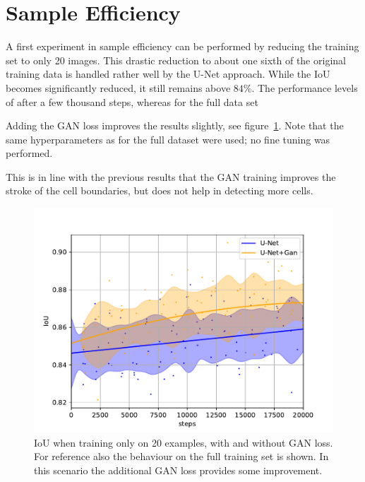 \documentclass[aps,prl,twocolumn,groupedaddress,amsmath,amssymb]{revtex4-1}
\begin{document}
    \section{Sample Efficiency}

    A first experiment in sample efficiency can be performed by reducing the training set to only 20
    images. This drastic reduction to about one sixth of the original training data is handled
    rather well by the U-Net approach. While the IoU becomes significantly reduced, it still remains
    above $84\%$. The performance levels of after a few thousand steps, whereas for the full data 
    set 

    Adding the GAN loss improves the results slightly, see figure~\ref{fig:reduced_data}. Note that
    the same hyperparameters as for the full dataset were used; no fine tuning was performed. 

    This is in line with the previous results that the GAN training improves the stroke of the 
    cell boundaries, but does not help in detecting more cells.

    \begin{figure}[tbp]
        \begin{center}
        \includegraphics[width=\linewidth]{figures/less_data.pdf}
        \end{center}
        \caption{IoU when training only on 20 examples, with and without GAN loss. For reference
        also the behaviour on the full training set is shown. In this scenario the additional GAN
        loss provides some improvement.}
        \label{fig:reduced_data}
    \end{figure}
\end{document}
